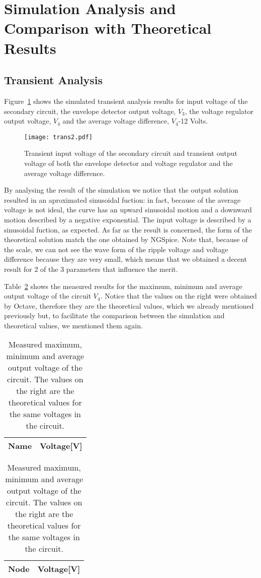 \section{Simulation Analysis and Comparison with Theoretical Results}
\label{sec:simulation}

\subsection{Transient Analysis}


Figure~\ref{fig:trans2} shows the simulated transient analysis results for input voltage of the secondary circuit,
the envelope detector output voltage, $V_3$, the voltage regulator output voltage, $V_4$ 
and the average voltage difference, $V_4$-12 Volts.

\begin{figure}[H] \centering
\texttt{[image: trans2.pdf]}
\caption{Transient input voltage of the secondary circuit and transient output voltage of both the envelope detector and 
voltage regulator and the average voltage difference.}
\label{fig:trans2}
\end{figure}

By analysing the result of the simulation we notice that the output solution resulted in an aproximated sinusoidal 
fuction: in fact, because of the average voltage is not ideal, the curve has an upward sinusoidal motion and 
a downward motion described by a negative exponential. The input voltage is described by a sinusoidal fuction, as expected. 
As far as the result is concerned, the form of the theoretical solution match the one obtained by NGSpice. 
Note that, because of the scale, we can not see the wave form of the ripple voltage and voltage difference because 
they are very small, which means that we obtained a decent result for 2 of the 3 parameters that influence the merit.


	Table~\ref{tab1:op} shows the measured results for the maximum, minimum and average output voltage of the circuit $V_4$. 
	Notice that the values on the right were obtained by Octave, therefore they are the theoretical values, which we already 
	mentioned previously but, to facilitate the comparison between the simulation and theoretical values, we mentioned them again.

\begin{table}[H]
  \centering
  \begin{tabular}{|l|r|}
    \hline    
    {\bf Name} & {\bf Voltage[V]} \\ \hline
    
  \end{tabular}
  \begin{tabular}{|l|r|}
    \hline    
    {\bf Node} & {\bf Voltage[V]} \\ \hline
    
  \end{tabular}
  \caption {Measured maximum, minimum and average output voltage of the circuit. 
  The values on the right are the theoretical values for the same voltages in the circuit.}
  \label{tab1:op}
\end{table}


